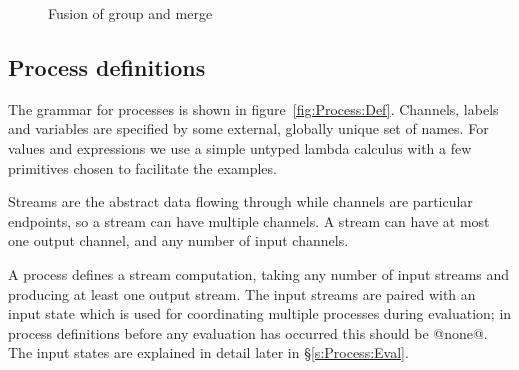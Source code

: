 \begin{figure}
% 
% 
% 
\caption{Fusion of group and merge}
\label{fig:Process:Fused}
\end{figure}



\clearpage{}
\subsection{Process definitions}



The grammar for processes is shown in figure~\ref{fig:Process:Def}.
Channels, labels and variables are specified by some external, globally unique set of names.
For values and expressions we use a simple untyped lambda calculus with a few primitives chosen to facilitate the examples.

Streams are the abstract data flowing through while channels are particular endpoints, so a stream can have multiple channels.
A stream can have at most one output channel, and any number of input channels.

A process defines a stream computation, taking any number of input streams and producing at least one output stream.
The input streams are paired with an input state which is used for coordinating multiple processes during evaluation; in process definitions before any evaluation has occurred this should be @none@.
The input states are explained in detail later in \S\ref{s:Process:Eval}.

